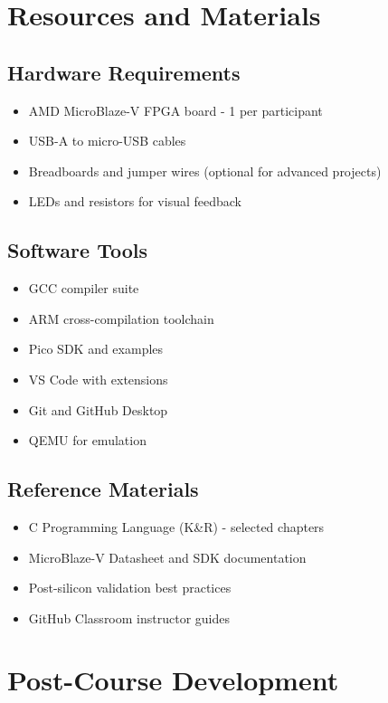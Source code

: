 \documentclass[11pt,a4paper]{article}
\begin{document}
\section{Resources and Materials}

\subsection{Hardware Requirements}
\begin{itemize}
    \item AMD MicroBlaze-V FPGA board - 1 per participant
    \item USB-A to micro-USB cables
    \item Breadboards and jumper wires (optional for advanced projects)
    \item LEDs and resistors for visual feedback
\end{itemize}

\subsection{Software Tools}
\begin{itemize}
    \item GCC compiler suite
    \item ARM cross-compilation toolchain
    \item Pico SDK and examples
    \item VS Code with extensions
    \item Git and GitHub Desktop
    \item QEMU for emulation
\end{itemize}

\subsection{Reference Materials}
\begin{itemize}
    \item C Programming Language (K\&R) - selected chapters
    \item MicroBlaze-V Datasheet and SDK documentation
    \item Post-silicon validation best practices
    \item GitHub Classroom instructor guides
\end{itemize}

\section{Post-Course Development}
\end{document}
